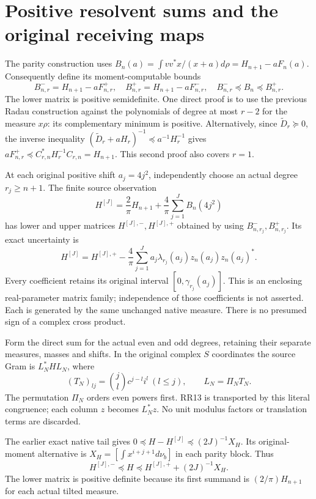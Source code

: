 \documentclass[11pt]{article}
\begin{document}
\section{Positive resolvent sums and the original receiving maps}
The parity construction uses
$B_n(a)=\int vv^*x/(x+a)d\rho=H_{n+1}-aF_n(a)$.
Consequently define its moment-computable bounds
\begin{equation}\tag{RR12}\label{rrnative:eq:B}
 B^-_{n,r}=H_{n+1}-aF^+_{n,r},\quad
 B^+_{n,r}=H_{n+1}-aF^-_{n,r},\quad
 B^-_{n,r}\preceq B_n\preceq B^+_{n,r}.
\end{equation}
The lower matrix is positive semidefinite. One direct proof is to
use the previous Radau construction against the polynomials of
degree at most $r-2$ for the measure $x\rho$: its complementary
minimum is positive. Alternatively, since
$\widetilde D_r\succeq0$, the inverse inequality
$(\widetilde D_r+aH_r)^{-1}\preceq a^{-1}H_r^{-1}$ gives
$aF^+_{n,r}\preceq C_{r,n}^*H_r^{-1}C_{r,n}=H_{n+1}$.
This second proof also covers $r=1$.

At each original positive shift $a_j=4j^2$, independently choose
an actual degree $r_j\ge n+1$. The finite source observation
\[
 H^{[J]}=\frac2\pi H_{n+1}
          +\frac4\pi\sum_{j=1}^JB_n(4j^2)
\]
has lower and upper matrices $H^{[J],-},H^{[J],+}$ obtained by
using $B^-_{n,r_j},B^+_{n,r_j}$. Its exact uncertainty is
\begin{equation}\tag{RR13}\label{rrnative:eq:zonotope}
 H^{[J]}=H^{[J],+}
    -\frac4\pi\sum_{j=1}^J a_j\lambda_{r_j}(a_j)z_n(a_j)z_n(a_j)^*.
\end{equation}
Every coefficient retains its original interval $[0,\gamma_{r_j}(a_j)]$.
This is an enclosing real-parameter matrix family; independence of
those coefficients is not asserted. Each is generated by the same
unchanged native measure. There is no presumed sign of a complex
cross product.

Form the direct sum for the actual even and odd degrees, retaining
their separate measures, masses and shifts. In the original complex
$S$ coordinates the source Gram is $L_N^*HL_N$, where
\[
 (T_N)_{lj}=\binom jl c^{j-l}i^l\ (l\le j),\qquad
 L_N=\Pi_NT_N.
\]
The permutation $\Pi_N$ orders even powers first. RR13 is transported
by this literal congruence; each column $z$ becomes $L_N^*z$.
No unit modulus factors or translation terms are discarded.

The earlier exact native tail \cite{rrnative:TR} gives
$0\preceq H-H^{[J]}\preceq(2J)^{-1}X_H$.
Its original-moment alternative is
$X_H=[\int x^{i+j+1}d\nu_b]$ in each parity block. Thus
\begin{equation}\tag{RR14}\label{rrnative:eq:source}
 H^{[J],-}\preceq H\preceq H^{[J],+}+(2J)^{-1}X_H.
\end{equation}
The lower matrix is positive definite because its first summand
is $(2/\pi)H_{n+1}$ for each actual tilted measure.
\end{document}
